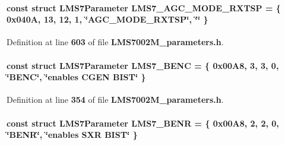 \paragraph[{L\+M\+S7\+\_\+\+A\+G\+C\+\_\+\+M\+O\+D\+E\+\_\+\+R\+X\+T\+SP}]{\setlength{\rightskip}{0pt plus 5cm}const struct {\bf L\+M\+S7\+Parameter} L\+M\+S7\+\_\+\+A\+G\+C\+\_\+\+M\+O\+D\+E\+\_\+\+R\+X\+T\+SP = \{ 0x040\+A, 13, 12, 1, \char`\"{}\+A\+G\+C\+\_\+\+M\+O\+D\+E\+\_\+\+R\+X\+T\+S\+P\char`\"{}, \char`\"{}\char`\"{} \}\hspace{0.3cm}{\ttfamily [static]}}\label{LMS7002M__parameters_8h_a0b53e2841e8d732513de185a6756726d}


Definition at line {\bf 603} of file {\bf L\+M\+S7002\+M\+\_\+parameters.\+h}.

\paragraph[{L\+M\+S7\+\_\+\+B\+E\+NC}]{\setlength{\rightskip}{0pt plus 5cm}const struct {\bf L\+M\+S7\+Parameter} L\+M\+S7\+\_\+\+B\+E\+NC = \{ 0x00\+A8, 3, 3, 0, \char`\"{}\+B\+E\+N\+C\char`\"{}, \char`\"{}enables C\+G\+E\+N B\+I\+S\+T\char`\"{} \}\hspace{0.3cm}{\ttfamily [static]}}\label{LMS7002M__parameters_8h_a660cc9b23137b3cf73f440041c19c4da}


Definition at line {\bf 354} of file {\bf L\+M\+S7002\+M\+\_\+parameters.\+h}.

\paragraph[{L\+M\+S7\+\_\+\+B\+E\+NR}]{\setlength{\rightskip}{0pt plus 5cm}const struct {\bf L\+M\+S7\+Parameter} L\+M\+S7\+\_\+\+B\+E\+NR = \{ 0x00\+A8, 2, 2, 0, \char`\"{}\+B\+E\+N\+R\char`\"{}, \char`\"{}enables S\+X\+R B\+I\+S\+T\char`\"{} \}\hspace{0.3cm}{\ttfamily [static]}}\label{LMS7002M__parameters_8h_abde744b7a31370d70099fb683a779d6e}



